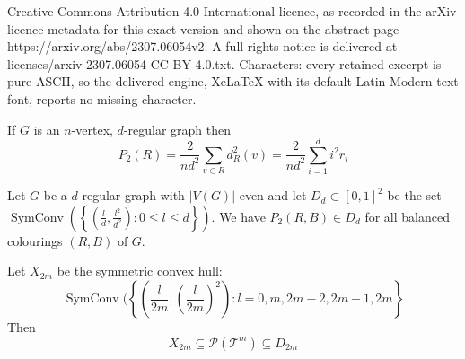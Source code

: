 \documentclass[10pt,a4paper]{amsart}
\DeclareMathOperator{\sch}{SymConv}
\newcommand{\Pcal}{\mathcal P}
\newcommand{\T}{\mathcal T}
\begin{document}
Creative Commons Attribution 4.0 International licence, as recorded in the arXiv licence metadata for this exact version and shown on the abstract page https://arxiv.org/abs/2307.06054v2. A full rights notice is delivered at licenses/arxiv-2307.06054-CC-BY-4.0.txt. Characters: every retained excerpt is pure ASCII, so the delivered engine, XeLaTeX with its default Latin Modern text font, reports no missing character.
\begin{lemma}\label{squares}
If $G$ is an $n$-vertex, $d$-regular graph then
\[
P_2(R)=\frac{2}{nd^2}\sum_{v\in R} d^2_R(v)=\frac{2}{nd^2}\sum_{i=1}^d i^2r_i
\]
\end{lemma}

\begin{thm}\label{main:thm}
Let $G$ be a $d$-regular graph with $|V(G)|$ even and let $D_d \subset [0,1]^2$ be the set $\sch\left(\left\{\left(\frac{l}{d},\frac{l^2}{d^2}\right):0 \leq l \leq d\right\}\right)$. We have $P_2(R,B)\in D_d$ for all balanced colourings $(R,B)$ of $G$. 
\end{thm}

\begin{cor}\label{construction}
Let $X_{2m}$ be the symmetric convex hull:
\[
\sch(\left\{\left(\frac{l}{2m},\left(\frac{l}{2m}\right)^2\right) : l=0,m,2m-2,2m-1,2m\right\}
\]
Then
\[
X_{2m}\subseteq\Pcal(\T^m)\subseteq D_{2m}
\]
\end{cor}
\end{document}
